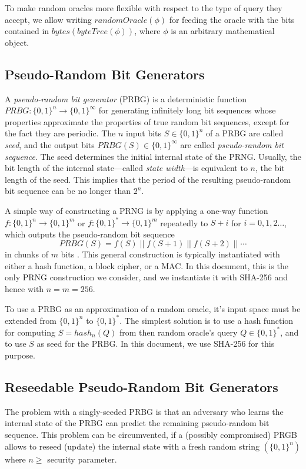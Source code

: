 \documentclass[bibtotoc,halfparskip,oneside]{scrreprt}
\newcommand{\conc}{\ensuremath{\;||\;}}
\begin{document}
To make random oracles more flexible with respect to the type of query they accept, we allow writing $\mathit{randomOracle}(\phi)$ for feeding the oracle with the bits contained  in  $\mathit{bytes}(\mathit{byteTree}(\phi))$, where $\phi$ is an arbitrary mathematical object.

\subsection{Pseudo-Random Bit Generators}

A \emph{pseudo-random bit generator} (PRBG) is a deterministic function $\mathit{PRBG}:\{0,1\}^n\rightarrow\{0,1\}^\infty$ for generating infinitely long bit sequences whose properties approximate the properties of true random bit sequences, except for the fact they are periodic. The $n$ input bits $S\in \{0,1\}^n$ of a PRBG are called \emph{seed}, and the output bits $\mathit{PRBG}(S)\in\{0,1\}^\infty$ are called \emph{pseudo-random bit sequence}. The seed determines the initial internal state of the PRNG. Usually, the bit length of the internal state---called \emph{state width}---is equivalent to $n$, the bit length of the seed. This implies that the period of the resulting pseudo-random bit sequence can be no longer than $2^n$. 

A simple way of constructing a PRNG is by applying a one-way function $f:\{0,1\}^n\rightarrow\{0,1\}^m$ or $f:\{0,1\}^*\rightarrow\{0,1\}^m$ repeatedly to $S+i$ for $i=0,1,2\ldots$, which outputs the pseudo-random bit sequence 
	$$\mathit{PRBG}(S)=f(S)\conc f(S+1)\conc f(S+2)\conc \cdots$$
in chunks of $m$ bits \cite{MOV96}. This general construction is typically instantiated with either a hash function, a block cipher, or a MAC. In this document, this is the only PRNG construction we consider, and we instantiate it with SHA-256 and hence with $n=m=256$. 

To use a PRBG as an approximation of a random oracle, it's input space must be extended from $\{0,1\}^n$ to $\{0,1\}^*$. The simplest solution is to use a hash function for computing  $S=\mathit{hash}_n(Q)$ from then random oracle's query $Q\in\{0,1\}^*$, and to use $S$ as seed for the PRBG. In this document, we use SHA-256 for this purpose.

\subsection{Reseedable Pseudo-Random Bit Generators}

The problem with a singly-seeded PRBG is that an adversary who learns the internal state of the PRBG can predict the remaining pseudo-random bit sequence. This problem can be circumvented, if a (possibly compromised) PRGB allows to reseed (update) the internal state with a fresh random string $(\{0,1\}^n)$ where $n\geq$ security parameter. 
\end{document}
